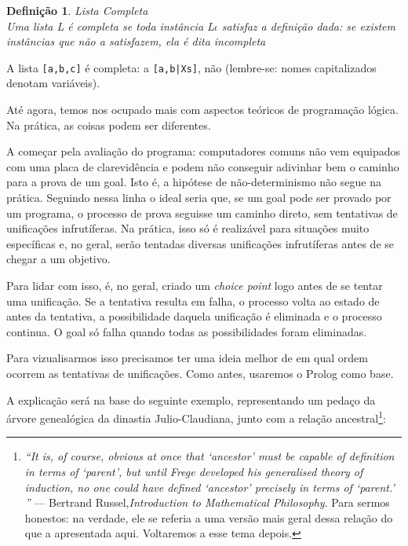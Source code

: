 \documentclass{article}
\newtheorem{definition}{Definição}[section]
\theoremstyle{remark}
\begin{document}
\begin{definition}{Lista Completa}
\\ Uma lista L é completa se toda instância L$\iota$ satisfaz a definição dada: se existem instâncias que não a satisfazem, ela é dita incompleta
\end{definition}

A lista {\tt[a,b,c]} é completa: a {\tt[a,b|Xs]}, não (lembre-se: nomes capitalizados denotam variáveis).


Até agora, temos nos ocupado mais com aspectos teóricos de programação lógica. Na prática, as coisas podem ser diferentes.

A começar pela avaliação do programa: computadores comuns não vem equipados com uma placa de clarevidência e podem não conseguir adivinhar bem o caminho para a prova de um goal. Isto é, a hipótese de não-determinismo não segue na prática. Seguindo nessa linha o ideal seria que, se um goal pode ser provado por um programa, o processo de prova seguisse um caminho direto, sem tentativas de unificações infrutíferas. Na prática, isso só é realizável para situações muito específicas e, no geral, serão tentadas diversas unificações infrutíferas antes de se chegar a um objetivo.

Para lidar com isso, é, no geral, criado um {\it choice point} logo antes de se tentar uma unificação. Se a tentativa resulta em falha, o processo volta ao estado de antes da tentativa, a possibilidade daquela unificação é eliminada e o processo continua. O goal só falha quando todas as possibilidades foram eliminadas.

Para vizualisarmos isso precisamos ter uma ideia melhor de em qual ordem ocorrem as tentativas de unificações. Como antes, usaremos o Prolog como base.

A explicação será na base do seguinte exemplo, representando um pedaço da árvore genealógica da dinastia Julio-Claudiana, junto com a relação ancestral\footnote{\textit{``It is, of course, obvious at once that `ancestor' must be capable
of definition in terms of `parent', but until Frege developed his generalised theory of induction, no one could have defined `ancestor' precisely in terms of `parent.' ''} --- Bertrand Russel,\textit{Introduction to Mathematical Philosophy}. Para sermos honestos: na verdade, ele se referia a uma versão mais geral dessa relação do que a apresentada aqui. Voltaremos a esse tema depois.}:


\end{document}
